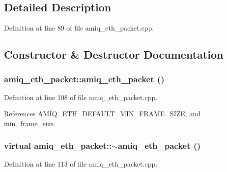 \subsection{Detailed Description}


Definition at line 89 of file amiq\_\-eth\_\-packet.cpp.

\subsection{Constructor \& Destructor Documentation}
\hypertarget{classamiq__eth__packet_a43b53f467fec192349879a89c51fe33c}{
\subsubsection[{amiq\_\-eth\_\-packet}]{\setlength{\rightskip}{0pt plus 5cm}amiq\_\-eth\_\-packet::amiq\_\-eth\_\-packet ()}}
\label{classamiq__eth__packet_a43b53f467fec192349879a89c51fe33c}


Definition at line 108 of file amiq\_\-eth\_\-packet.cpp.

References AMIQ\_\-ETH\_\-DEFAULT\_\-MIN\_\-FRAME\_\-SIZE, and min\_\-frame\_\-size.\hypertarget{classamiq__eth__packet_a2734b85141844331fded960c4c91f8b7}{
\subsubsection[{$\sim$amiq\_\-eth\_\-packet}]{\setlength{\rightskip}{0pt plus 5cm}virtual amiq\_\-eth\_\-packet::$\sim$amiq\_\-eth\_\-packet ()}}
\label{classamiq__eth__packet_a2734b85141844331fded960c4c91f8b7}


Definition at line 113 of file amiq\_\-eth\_\-packet.cpp.

